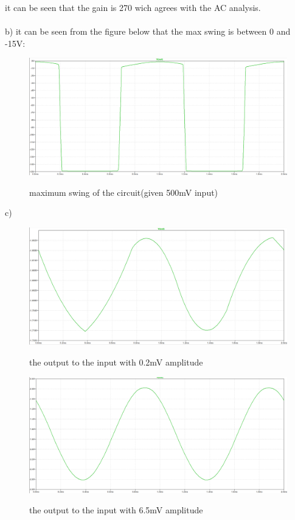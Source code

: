 \documentclass[11pt]{article}
\begin{document}
it can be seen that the gain is 270 wich agrees with the AC analysis. \\ \\

b) it can be seen from the figure below that the max swing is between 0 and -15V:
\begin{figure}[H]
    \begin{center}
        \includegraphics[scale=0.45]{Fig/1k-maxswing.png}
        \label{fig:1kMaxSwing}
        \caption{maximum swing of the circuit(given 500mV input)}
    \end{center}
\end{figure}
c) 
\begin{figure}[H]
    \begin{center}
        \includegraphics[scale=0.45]{Fig/1k-output.png}
        \label{fig:1kfreqout}
        \caption{the output to the input with 0.2mV amplitude}
    \end{center}
\end{figure}

\begin{figure}[H]
    \begin{center}
        \includegraphics[scale=0.45]{Fig/1k-unlinaer.png}
        \label{fig:1kfreqout}
        \caption{the output to the input with 6.5mV amplitude}
    \end{center}
\end{figure}
\end{document}
